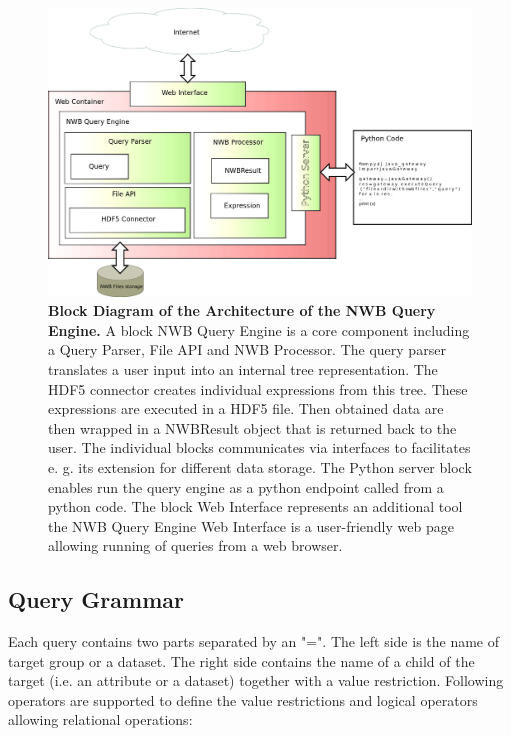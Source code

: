 \documentclass[utf8]{frontiersSCNS} %
\begin{document}
\begin{figure}
  \includegraphics[width=17cm]{architecture}
\caption{\textbf{Block Diagram of the Architecture of the NWB Query Engine. } A block NWB Query Engine is a core component including a Query Parser, File API and NWB Processor. The query parser translates a user input into an internal tree representation. The HDF5 connector creates individual expressions from this tree. These expressions are executed in a HDF5 file. Then obtained data are then wrapped in a NWBResult object that is returned back to the user. The individual blocks communicates via interfaces to facilitates e. g. its extension for different data storage. The Python server block enables run the query engine as a python endpoint called from a python code. The block Web Interface represents an additional tool the NWB Query Engine Web Interface is a user-friendly web page allowing running of queries from a web browser.}
\label{fig:architecture}
\end{figure}


\subsection{Query Grammar}
\label{Query_Grammar}

Each query contains two parts separated by an "=". The left side is the name of target group or a dataset. The right side contains the name of a child of the target (i.e. an attribute or a dataset) together with a value restriction. Following operators are supported to define the value restrictions and logical operators allowing relational operations:
\end{document}
